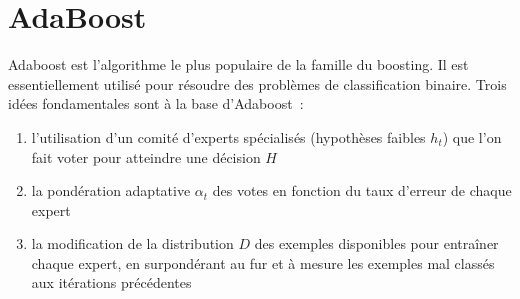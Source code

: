 \documentclass[pdftex,a4paper,11pt]{article}
\begin{document}

\section{AdaBoost}

Adaboost est l'algorithme le plus populaire de la famille du boosting. Il est essentiellement utilisé pour résoudre des problèmes de classification binaire. Trois idées fondamentales sont à la base d'Adaboost~:
\begin{enumerate}
    \item l'utilisation d'un comité d'experts spécialisés (hypothèses faibles $h_t$) que l'on fait voter pour atteindre une décision $H$
    \item la pondération adaptative $\alpha_t$ des votes en fonction du taux d'erreur de chaque expert
    \item la modification de la distribution $D$ des exemples disponibles pour entraîner chaque expert, en surpondérant au fur et à mesure les exemples mal classés aux itérations précédentes
\end{enumerate}
\end{document}
